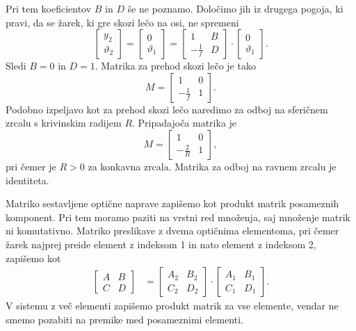 Pri tem koeficientov $B$ in $D$ še ne poznamo. Določimo jih iz drugega pogoja, 
ki pravi, da se žarek, ki gre skozi lečo na osi, ne spremeni
\begin{equation}
\left[\begin{array}{c}
y_{2}\\
\vartheta_{2}
\end{array}\right]=\left[\begin{array}{c}
0\\
\vartheta_{1}
\end{array}\right]=\left[\begin{array}{cc}
1 & B\\
-\frac{1}{f} & D
\end{array}\right]\cdot\left[\begin{array}{c}
0\\
\vartheta_{1}
\end{array}\right].
\end{equation}
 Sledi $B=0$ in $D=1$. Matrika za prehod skozi lečo je tako 
\begin{equation}
M= \left[\begin{array}{cc}
1 & 0\\
-\frac{1}{f} & 1
\end{array}\right].
\label{eq:MABCD2}
\end{equation}
Podobno izpeljavo kot za prehod skozi lečo naredimo za odboj na sferičnem zrcalu
s krivinskim radijem $R$. Pripadajoča matrika je 
\begin{equation}
M=\left[\begin{array}{cc}
1 & 0\\
-\frac{2}{R} & 1
\end{array}\right],
\end{equation}
pri čemer je $R>0$ za konkavna zrcala. Matrika za odboj na ravnem zrcalu je identiteta.

Matriko sestavljene optične naprave zapišemo kot produkt matrik posameznih komponent. 
Pri tem moramo paziti na vrstni red množenja, saj množenje matrik ni komutativno.
Matriko preslikave z dvema optičnima elementoma, pri čemer žarek 
najprej preide element z indeksom 1 in nato element z indeksom 2, zapišemo kot 
\begin{align}
\left[\begin{array}{cc}
A & B\\
C & D
\end{array}\right] & =  \left[\begin{array}{cc}
A_{2} & B_{2}\\
C_{2} & D_{2}
\end{array}\right]\cdot\left[\begin{array}{cc}
A_{1} & B_{1}\\
C_{1} & D_{1}
\end{array}\right].
\end{align}
V sistemu z več elementi zapišemo produkt matrik za vse elemente, 
vendar ne smemo pozabiti na premike med posameznimi elementi.

